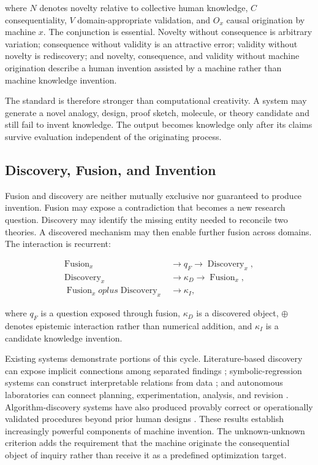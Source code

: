 where $N$ denotes novelty relative to collective human knowledge, $C$
consequentiality, $V$ domain-appropriate validation, and $O_x$ causal
origination by machine $x$. The conjunction is essential. Novelty without
consequence is arbitrary variation; consequence without validity is an
attractive error; validity without novelty is rediscovery; and novelty,
consequence, and validity without machine origination describe a human
invention assisted by a machine rather than machine knowledge invention.

The standard is therefore stronger than computational creativity. A system may
generate a novel analogy, design, proof sketch, molecule, or theory candidate
and still fail to invent knowledge. The output becomes knowledge only after its
claims survive evaluation independent of the originating process.

\subsection{\textbf{Discovery, Fusion, and Invention}}

Fusion and discovery are neither mutually exclusive nor guaranteed to produce
invention. Fusion may expose a contradiction that becomes a new research
question. Discovery may identify the missing entity needed to reconcile two
theories. A discovered mechanism may then enable further fusion across domains.
The interaction is recurrent:

\begin{equation}
\begin{aligned}
\operatorname{Fusion}_{x}
&\longrightarrow q_F
\longrightarrow \operatorname{Discovery}_{x},\\
\operatorname{Discovery}_{x}
&\longrightarrow \kappa_D
\longrightarrow \operatorname{Fusion}_{x},\\
\operatorname{Fusion}_{x}oplus
\operatorname{Discovery}_{x}
&\longrightarrow \kappa_I,
\end{aligned}
\label{eq:fusion_discovery_invention}
\end{equation}

where $q_F$ is a question exposed through fusion, $\kappa_D$ is a discovered
object, $\oplus$ denotes epistemic interaction rather than numerical addition,
and $\kappa_I$ is a candidate knowledge invention.

Existing systems demonstrate portions of this cycle. Literature-based
discovery can expose implicit connections among separated findings
\cite{swanson1986fish}; symbolic-regression systems can construct interpretable
relations from data \cite{schmidt2009laws,udrescu2020aifeynman}; and autonomous
laboratories can connect planning, experimentation, analysis, and revision
\cite{boiko2023autonomous,szymanski2023autonomous}. Algorithm-discovery systems
have also produced provably correct or operationally validated procedures
beyond prior human designs \cite{fawzi2022alphatensor,mankowitz2023alphadev}.
These results establish increasingly powerful components of machine invention.
The unknown-unknown criterion adds the requirement that the machine originate
the consequential object of inquiry rather than receive it as a predefined
optimization target.

